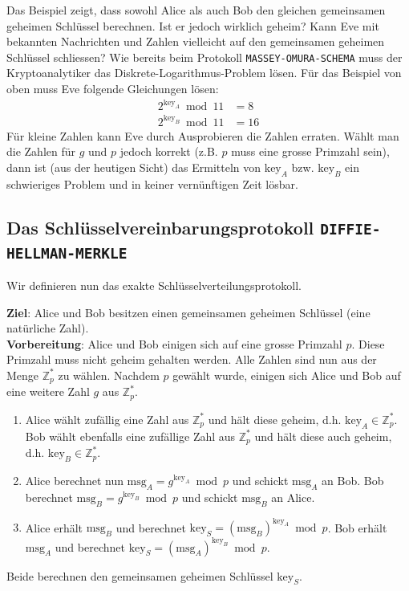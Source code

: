 Das Beispiel zeigt, dass sowohl Alice als auch Bob den gleichen gemeinsamen geheimen Schlüssel berechnen. Ist er jedoch wirklich geheim? Kann Eve mit bekannten Nachrichten und Zahlen vielleicht auf den gemeinsamen geheimen Schlüssel schliessen? Wie bereits beim Protokoll \texttt{MASSEY-OMURA-SCHEMA} muss der Kryptoanalytiker das Diskrete-Logarithmus-Problem lösen. Für das Beispiel von oben muss Eve folgende Gleichungen lösen:
\begin{align*}
	2^{\text{key}_A} \bmod 11 & = 8 \\
	2^{\text{key}_B} \bmod 11 & = 16
\end{align*}
Für kleine Zahlen kann Eve durch Ausprobieren die Zahlen erraten. Wählt man die Zahlen für $g$ und $p$ jedoch korrekt (z.B. $p$ muss eine grosse Primzahl sein), dann ist (aus der heutigen Sicht) das Ermitteln von $\text{key}_A$ bzw. $\text{key}_B$ ein schwieriges Problem und in keiner vernünftigen Zeit lösbar.

\subsection{Das Schlüsselvereinbarungsprotokoll \texttt{DIFFIE-HELLMAN-MERKLE}}

Wir definieren nun das exakte Schlüsselverteilungsprotokoll.

\begin{definition}
\textbf{Ziel}: Alice und Bob besitzen einen gemeinsamen geheimen Schlüssel (eine natürliche Zahl). \\ \textbf{Vorbereitung}: Alice und Bob einigen sich auf eine grosse Primzahl $p$. Diese Primzahl muss nicht geheim gehalten werden. Alle Zahlen sind nun aus der Menge $\mathbb{Z}_{p}^*$ zu wählen. Nachdem $p$ gewählt wurde, einigen sich Alice und Bob auf eine weitere Zahl $g$ aus $\mathbb{Z}_{p}^*$.


\begin{enumerate}
	\item Alice wählt zufällig eine Zahl aus $\mathbb{Z}_{p}^*$ und hält diese geheim, d.h. $\text{key}_A \in \mathbb{Z}_{p}^*$. Bob wählt ebenfalls eine zufällige Zahl aus $\mathbb{Z}_{p}^*$ und hält diese auch geheim, d.h. $\text{key}_B \in \mathbb{Z}_{p}^*$.
	\item Alice berechnet nun $\text{msg}_A = g^{\text{key}_A} \bmod p$ und schickt $\text{msg}_A$ an Bob. Bob berechnet $\text{msg}_B = g^{\text{key}_B} \bmod p$ und schickt $\text{msg}_B$ an Alice.
	\item Alice erhält $\text{msg}_B$ und berechnet $\text{key}_S = (\text{msg}_B)^{\text{key}_A} \bmod p$. Bob erhält $\text{msg}_A$ und berechnet $\text{key}_S = (\text{msg}_A)^{\text{key}_B} \bmod p$.
\end{enumerate}

Beide berechnen den gemeinsamen geheimen Schlüssel $\text{key}_S$.

\end{definition}

